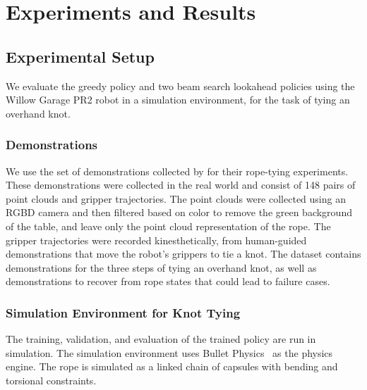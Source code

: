 \section{Experiments and Results}
\label{sec:experiments}



\subsection{Experimental Setup}
We evaluate the greedy policy and two beam search lookahead policies using the Willow Garage PR2 robot in a simulation environment, for the task of tying an overhand knot.

\subsubsection{Demonstrations}
We use the set of demonstrations collected by \citet{Schulmanetal_ISRR2013} for their rope-tying experiments.
These demonstrations were collected in the real world and consist of 148 pairs of point clouds and gripper trajectories.
The point clouds were collected using an RGBD camera and then filtered based on color to remove the green background of the table, and leave only the point cloud representation of the rope.
The gripper trajectories were recorded kinesthetically, from human-guided demonstrations that move the robot's grippers to tie a knot.
The dataset contains demonstrations for the three steps of tying an overhand knot, as well as demonstrations to recover from rope states that could lead to failure cases.

\subsubsection{Simulation Environment for Knot Tying} 
The training, validation, and evaluation of the trained policy are run in simulation.
The simulation environment uses Bullet Physics~\cite{Bullet_Physics} as the physics engine.
The rope is simulated as a linked chain of capsules with bending and torsional constraints.

